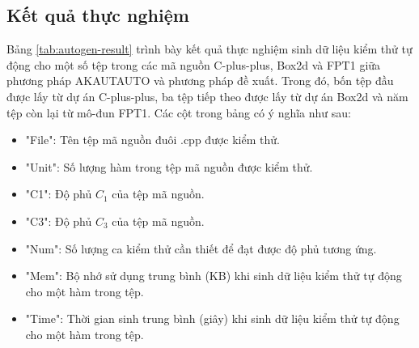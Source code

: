 \subsection{Kết quả thực nghiệm}
Bảng \ref{tab:autogen-result} trình bày kết quả thực nghiệm sinh dữ liệu kiểm thử tự động cho một số tệp trong các mã nguồn C-plus-plus, Box2d và FPT1 giữa phương pháp AKAUTAUTO và phương pháp đề xuất. Trong đó, bốn tệp đầu được lấy từ dự án C-plus-plus, ba tệp tiếp theo được lấy từ dự án Box2d và năm tệp còn lại từ mô-đun FPT1. Các cột trong bảng có ý nghĩa như sau:
\begin{itemize}
    \item "File": Tên tệp mã nguồn đuôi .cpp được kiểm thử.
    \item "Unit": Số lượng hàm trong tệp mã nguồn được kiểm thử.
    \item "C1": Độ phủ $C_1$ của tệp mã nguồn.
    \item "C3": Độ phủ $C_3$ của tệp mã nguồn.
    \item "Num": Số lượng ca kiểm thử cần thiết để đạt được độ phủ tương ứng.
    \item "Mem": Bộ nhớ sử dụng trung bình (KB) khi sinh dữ liệu kiểm thử tự động cho một hàm trong tệp.
    \item "Time": Thời gian sinh trung bình (giây) khi sinh dữ liệu kiểm thử tự động cho một hàm trong tệp.
\end{itemize}

